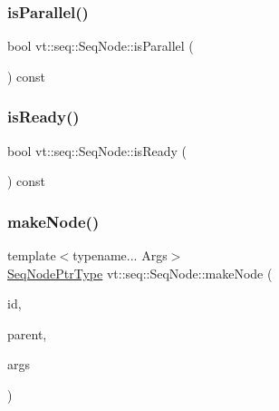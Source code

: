 \subsubsection{\texorpdfstring{is\+Parallel()}{isParallel()}}
{\footnotesize\ttfamily bool vt\+::seq\+::\+Seq\+Node\+::is\+Parallel (\begin{DoxyParamCaption}{ }\end{DoxyParamCaption}) const\hspace{0.3cm}{\ttfamily [inline]}}

\mbox{\label{structvt_1_1seq_1_1_seq_node_a94e0c20ef534afed7180b16d8af9a268}} 
\subsubsection{\texorpdfstring{is\+Ready()}{isReady()}}
{\footnotesize\ttfamily bool vt\+::seq\+::\+Seq\+Node\+::is\+Ready (\begin{DoxyParamCaption}{ }\end{DoxyParamCaption}) const}

\mbox{\label{structvt_1_1seq_1_1_seq_node_a5db1688ed515cf55ae71c58259560bc3}} 
\subsubsection{\texorpdfstring{make\+Node()}{makeNode()}}
{\footnotesize\ttfamily template$<$typename... Args$>$ \\
\hyperlink{namespacevt_1_1seq_ae6a4874b585be0612aaca32ca6d2d191}{Seq\+Node\+Ptr\+Type} vt\+::seq\+::\+Seq\+Node\+::make\+Node (\begin{DoxyParamCaption}\item[{\hyperlink{namespacevt_1_1seq_a3b612da217ac669d39c159f134ab8434}{Seq\+Type} const \&}]{id,  }\item[{\hyperlink{namespacevt_1_1seq_ae6a4874b585be0612aaca32ca6d2d191}{Seq\+Node\+Ptr\+Type}}]{parent,  }\item[{Args \&\&...}]{args }\end{DoxyParamCaption})\hspace{0.3cm}{\ttfamily [static]}}

